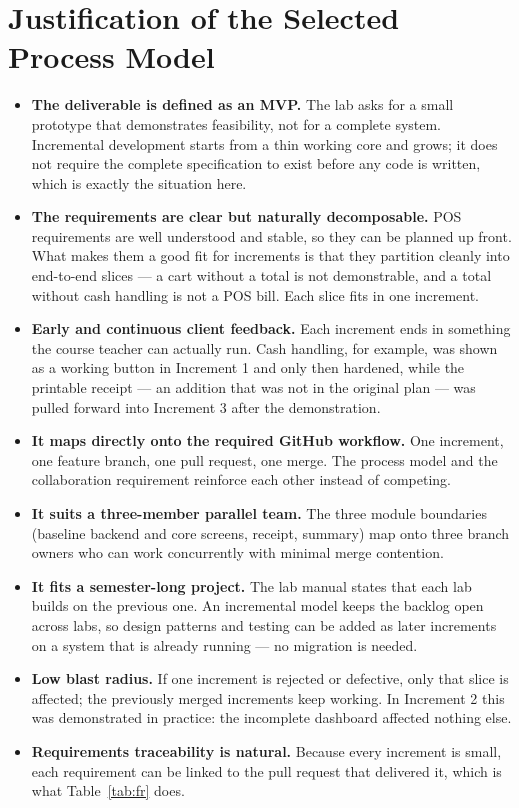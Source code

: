 \documentclass[11pt,a4paper]{article}
\begin{document}
\section{Justification of the Selected Process Model}
\label{sec:justification}

\begin{itemize}
  \item \textbf{The deliverable is defined as an MVP.} The lab asks for a small prototype that
        demonstrates feasibility, not for a complete system. Incremental development starts
        from a thin working core and grows; it does not require the complete specification to
        exist before any code is written, which is exactly the situation here.
  \item \textbf{The requirements are clear but naturally decomposable.} POS requirements are
        well understood and stable, so they can be planned up front. What makes them a good
        fit for increments is that they partition cleanly into end-to-end slices --- a cart
        without a total is not demonstrable, and a total without cash handling is not a POS
        bill. Each slice fits in one increment.
  \item \textbf{Early and continuous client feedback.} Each increment ends in something the
        course teacher can actually run. Cash handling, for example, was shown as a working
        button in Increment 1 and only then hardened, while the printable receipt --- an
        addition that was not in the original plan --- was pulled forward into Increment 3
        after the demonstration.
  \item \textbf{It maps directly onto the required GitHub workflow.} One increment, one
        feature branch, one pull request, one merge. The process model and the collaboration
        requirement reinforce each other instead of competing.
  \item \textbf{It suits a three-member parallel team.} The three module boundaries
        (baseline backend and core screens, receipt, summary) map onto three branch owners who
        can work concurrently with minimal merge contention.
  \item \textbf{It fits a semester-long project.} The lab manual states that each lab builds on
        the previous one. An incremental model keeps the backlog open across labs, so design
        patterns and testing can be added as later increments on a system that is already
        running --- no migration is needed.
  \item \textbf{Low blast radius.} If one increment is rejected or defective, only that slice
        is affected; the previously merged increments keep working. In Increment 2 this was
        demonstrated in practice: the incomplete dashboard affected nothing else.
  \item \textbf{Requirements traceability is natural.} Because every increment is small, each
        requirement can be linked to the pull request that delivered it, which is what
        Table~\ref{tab:fr} does.
\end{itemize}
\end{document}
